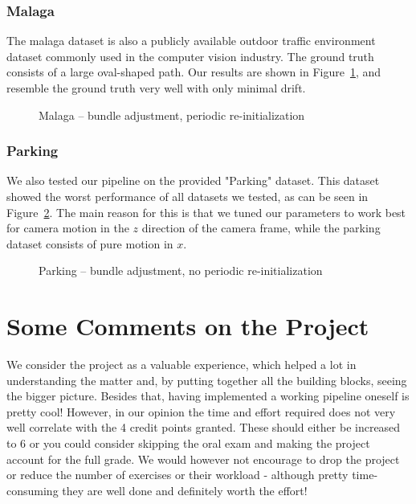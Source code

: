 \documentclass[11pt]{article}
\newlength\figureheight
\newlength\figurewidth
\begin{document}
\subsubsection{Malaga}
The malaga dataset is also a publicly available outdoor traffic environment dataset commonly used in the computer vision industry. The ground truth consists of a large oval-shaped path. Our results are shown in Figure~\ref{fig:malaga_BA_reinit}, and resemble the ground truth very well with only minimal drift.

\begin{figure}[!htb]
	\centering
	\setlength\figureheight{5cm} 
	\setlength\figurewidth{7cm}
	
	\caption{Malaga -- bundle adjustment, periodic re-initialization}
	\label{fig:malaga_BA_reinit}
\end{figure}

\subsubsection{Parking}
We also tested our pipeline on the provided "Parking" dataset. This dataset showed the worst performance of all datasets we tested, as can be seen in Figure~\ref{fig:parking_BA_reinit}. The main reason for this is that we tuned our parameters to work best for camera motion in the $z$ direction of the camera frame, while the parking dataset consists of pure motion in $x$.

\begin{figure}[!htb]
	\centering
	\setlength\figureheight{5cm} 
	\setlength\figurewidth{7cm}
	
	\caption{Parking -- bundle adjustment, no periodic re-initialization}
	\label{fig:parking_BA_reinit}
\end{figure}

\newpage

\section*{Some Comments on the Project}
We consider the project as a valuable experience, which helped a lot in understanding the matter and, by putting together all the building blocks, seeing the bigger picture. Besides that, having implemented a working pipeline oneself is pretty cool! However, in our opinion the time and effort required does not very well correlate with the 4 credit points granted. These should either be increased to 6 or you could consider skipping the oral exam and making the project account for the full grade. We would however not encourage to drop the project or reduce the number of exercises or their workload - although pretty time-consuming they are well done and definitely worth the effort!

\end{document}
